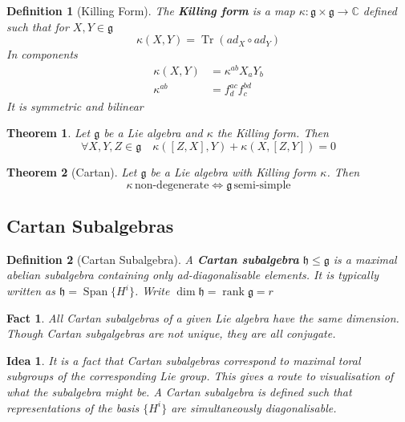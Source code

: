 \documentclass{article}
\newtheorem{theorem}{Theorem}[subsection]
\newtheorem{definition}{Definition}[subsection]
\newtheorem{fact}{Fact}[subsection]
\newtheorem*{idea}{Idea}
\DeclareMathOperator{\spn}{Span}
\DeclareMathOperator{\tr}{Tr}
\DeclareMathOperator{\rank}{rank}
\newcommand{\bam}[1]{\textbf{#1}}
\newcommand{\mf}[1]{\mathfrak{#1}}
\newcommand{\mbb}[1]{\mathbb{#1}}
\newcommand{\comm}[2][]{\left[ #1, #2 \right]}
\newcommand{\set}[1]{\lbrace #1 \rbrace}
\begin{document}
\begin{definition}[Killing Form]
The \bam{Killing form} is a map $\kappa:\mf{g}\times\mf{g}\to\mbb{C}$ defined such that for $X,Y\in\mf{g}$
\[
\kappa\left(X,Y\right)=\tr\left(ad_X \circ ad_Y\right)
\]
In components 
\begin{align*}
    \kappa(X,Y) &= \kappa^{ab}X_a Y_b \\
    \kappa^{ab} &= f^{ac}_d f^{bd}_c
\end{align*}
It is symmetric and bilinear 
\end{definition}

\begin{theorem}
Let $\mf{g}$ be a Lie algebra and $\kappa$ the Killing form. Then
\[
\forall X,Y,Z\in\mf{g} \quad \kappa\left(\comm[Z]{X},Y\right)+\kappa\left(X,\comm[Z]{Y}\right)=0
\]
\end{theorem}

\begin{theorem}[Cartan]
Let $\mf{g}$ be a Lie algebra with Killing form $\kappa$. Then 
\[
\kappa \, \text{non-degenerate} \Leftrightarrow \mf{g} \, \text{semi-simple}
\]
\end{theorem}

\subsection{Cartan Subalgebras}

\begin{definition}[Cartan Subalgebra]
A \bam{Cartan subalgebra} $\mf{h}\leq\mf{g}$ is a maximal abelian subalgebra containing only ad-diagonalisable elements. It is typically written as $\mf{h}=\spn\set{ H^i }$. Write $\dim{\mf{h}}=\rank{\mf{g}}=r$
\end{definition}

\begin{fact}
All Cartan subalgebras of a given Lie algebra have the same dimension. Though Cartan subgalgebras are not unique, they are all conjugate. 
\end{fact}

\begin{idea}
It is a fact that Cartan subalgebras correspond to maximal toral subgroups of the corresponding Lie group. This gives a route to visualisation of what the subalgebra might be. A Cartan subalgebra is defined such that representations of the basis $\set{ H^i }$ are simultaneously diagonalisable. 
\end{idea}
\end{document}
